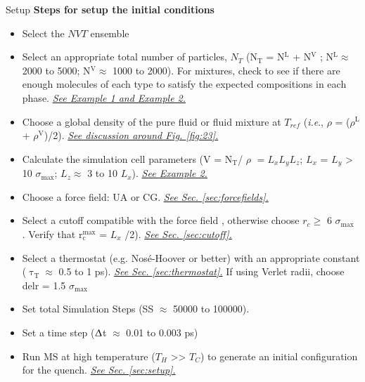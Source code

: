 \documentclass[9pt,tutorial]{livecoms}
\newcommand{\checkref}[1]{\uline{\emph{{\color{LiveCoMSDarkBlue}#1}}}}
\begin{document}
\begin{Checklists*}[p!]
\begin{checklist}{Setup}
\textbf{Steps for setup the initial conditions}
\begin{itemize}
\item Select the $NVT$ ensemble \\
\item Select an appropriate total number of particles, $N_{T}$ (N$_{\mathrm{T}}$ = N$^{\mathrm{L}}$ + N$^{\mathrm{V}}$ ; N$^{\mathrm{L}}{\approx}$ 2000 to 5000; N$^{\mathrm{V}}{\approx}$ 1000 to 2000). For mixtures, check to see if there are enough molecules of each type to satisfy the expected compositions in each phase. \checkref{See Example 1 and Example 2.} \\
\item Choose a global density of the pure fluid or fluid mixture at $T_{ref}$ (\textit{i.e}., {${\rho}$} = ({${\rho}$}$^{\mathrm{L}}$ + {${\rho}$}$^{\mathrm{V}}$)/2). \checkref{See discussion around Fig. \ref{fig:23}.} \\
\item Calculate the simulation cell parameters (V = N$_{\mathrm{T}}$/ {${\rho}$} $= L_{x}L_{y}L_{z}$; $L_{x}$ = $L_{y}$ {\textgreater} 10 ${\sigma}_{\mathrm{max}}$;  $L_{z}{\approx}$ 3 to 10 $L_{x}$). \checkref{See Example 2.} \\
\item Choose a force field: UA or CG. \checkref{See Sec. \ref{sec:forcefields}.} \\
\item Select a cutoff compatible with the force field , otherwise choose $r_{c}{\geq}$ 6 ${\sigma}_{\mathrm{max}}$ . Verify that r$_{\mathrm{c}}^{\mathrm{max}}$ = $L_{x}$ /2). \checkref{See Sec. \ref{sec:cutoff}.} \\
\item Select a thermostat (e.g. Nos\'e-Hoover or better) with an appropriate constant (${\uptau}_{\mathrm{T}}{\approx}$ 0.5 to 1 ps). \checkref{See Sec. \ref{sec:thermostat}.} If using Verlet radii, choose delr = 1.5 ${\sigma}_{\mathrm{max}}$ \\
\item Set total Simulation Steps (SS ${\approx}$ 50000 to 100000). \\
\item Set a time step (${\Updelta}$t ${\approx}$ 0.01 to 0.003 ps) \\
\item Run MS at high temperature ($T_{H}$ {\textgreater}{\textgreater} $T_{C}$) to generate an initial configuration for the quench. \checkref{See Sec. \ref{sec:setup}.} \\
\end{itemize}
\end{checklist}


\end{Checklists*}
\end{document}
